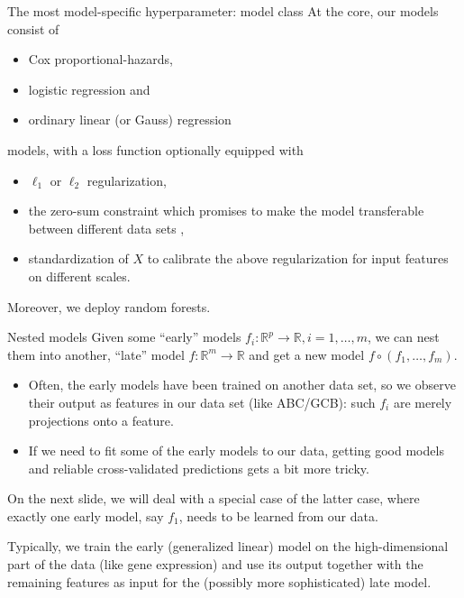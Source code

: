 \documentclass[10pt, aspectratio=169]{beamer}
\def\RR{\mathbb{R}}
\begin{document}
\begin{frame}{The most model-specific hyperparameter: model class}
  At the core, our models consist of 
  \begin{itemize}
    \item Cox proportional-hazards,
    \item logistic regression and 
    \item ordinary linear (or Gauss) regression
  \end{itemize}
  models, \pause with a loss function optionally equipped with
  \begin{itemize}
    \item $\ell_1$ or $\ell_2$ regularization,
    \item the zero-sum constraint which promises to make the model transferable
      between different data sets \cite{transplatform17},
    \item standardization of $X$ to calibrate the above regularization for input
      features on different scales.
  \end{itemize}

  \pause
  Moreover, we deploy random forests.
\end{frame}

\begin{frame}{Nested models}
  Given some ``early'' models $f_i: \RR^p \to \RR, i = 1, \ldots, m$, we can nest 
  them into another, ``late'' model $f: \RR^m \to \RR$ and get a new model 
  $f \circ (f_1, \ldots, f_m)$.

  \pause
  \begin{itemize}
    \item Often, the early models have been trained on another data set, so we 
      observe their output as features in our data set (like ABC/GCB): such $f_i$
      are merely projections onto a feature.
    \item If we need to fit some of the early models to our data, getting good 
      models and reliable cross-validated predictions gets a bit more tricky. 
  \end{itemize}
  \pause
  On the next slide, we will deal with a special case of the latter case, where 
  exactly one early model, say $f_1$, needs to be learned from our data.

  Typically, we train the early (generalized linear) model on the high-dimensional 
  part of the data (like gene expression) and use its output together with the 
  remaining features as input for the (possibly more sophisticated) late model.
\end{frame}
\end{document}
